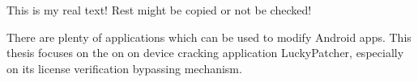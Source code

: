 This is my real text! Rest might be copied or not be checked!


There are plenty of applications which can be used to modify Android apps. This thesis focuses on the on on device cracking application LuckyPatcher, especially on its license verification bypassing mechanism.
